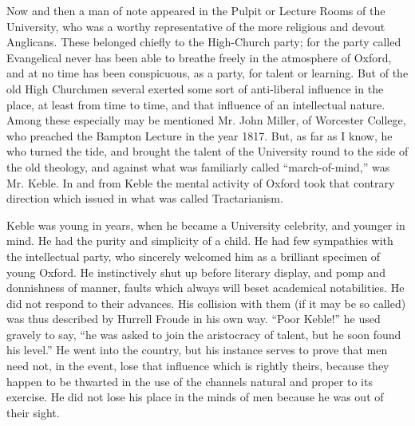 Now and then a man of note appeared in the Pulpit or Lecture Rooms of
the University, who was a worthy representative of the more religious
and devout Anglicans. These belonged chiefly to the High-Church party;
for the party called Evangelical never has been able to breathe freely
in the atmosphere of Oxford, and at no time has been conspicuous, as a
party, for talent or learning. But of the old High Churchmen several
exerted some sort of anti-liberal influence in the place, at least from
time to time, and that influence of an intellectual nature. Among these
especially may be mentioned Mr. John Miller, of Worcester College, who
preached the Bampton Lecture in the year 1817. But, as far as I know, he
who turned the tide, and brought the talent of the University round to the side of the old theology, and against what was familiarly
called ``march-of-mind,'' was Mr. Keble. In and from Keble the
mental activity of Oxford took that contrary direction which issued in
what was called Tractarianism.

Keble was young in years, when he became a University celebrity, and
younger in mind. He had the purity and simplicity of a child. He had few
sympathies with the intellectual party, who sincerely welcomed him as a
brilliant specimen of young Oxford. He instinctively shut up before
literary display, and pomp and donnishness of manner, faults which
always will beset academical notabilities. He did not respond to their
advances. His collision with them (if it may be so called) was thus
described by Hurrell Froude in his own way. ``Poor Keble!'' he
used gravely to say, ``he was asked to join the aristocracy of
talent, but he soon found his level.'' He went into the country, but
his instance serves to prove that men need not, in the event, lose that
influence which is rightly theirs, because they happen to be thwarted in
the use of the channels natural and proper to its exercise. He did not
lose his place in the minds of men because he was out of their sight.

